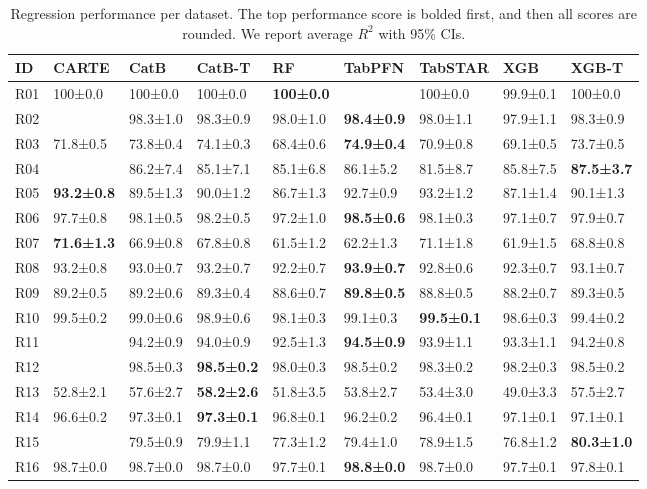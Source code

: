 \begin{table}
\center
\footnotesize
\caption{Regression performance per dataset. The top performance score is bolded first, and then all scores are rounded. We report average  $R^2$ with 95\% CIs.}
\label{tab:reg_10k_dataset_performance}
\begin{tabular}{lllllllll}
\toprule
ID & CARTE & CatB & CatB-T & RF & TabPFN & TabSTAR & XGB & XGB-T \\
\midrule
R01 & 100±0.0 & 100±0.0 & 100±0.0 & \textbf{100±0.0} &  & 100±0.0 & 99.9±0.1 & 100±0.0 \\
R02 &  & 98.3±1.0 & 98.3±0.9 & 98.0±1.0 & \textbf{98.4±0.9} & 98.0±1.1 & 97.9±1.1 & 98.3±0.9 \\
R03 & 71.8±0.5 & 73.8±0.4 & 74.1±0.3 & 68.4±0.6 & \textbf{74.9±0.4} & 70.9±0.8 & 69.1±0.5 & 73.7±0.5 \\
R04 &  & 86.2±7.4 & 85.1±7.1 & 85.1±6.8 & 86.1±5.2 & 81.5±8.7 & 85.8±7.5 & \textbf{87.5±3.7} \\
R05 & \textbf{93.2±0.8} & 89.5±1.3 & 90.0±1.2 & 86.7±1.3 & 92.7±0.9 & 93.2±1.2 & 87.1±1.4 & 90.1±1.3 \\
R06 & 97.7±0.8 & 98.1±0.5 & 98.2±0.5 & 97.2±1.0 & \textbf{98.5±0.6} & 98.1±0.3 & 97.1±0.7 & 97.9±0.7 \\
R07 & \textbf{71.6±1.3} & 66.9±0.8 & 67.8±0.8 & 61.5±1.2 & 62.2±1.3 & 71.1±1.8 & 61.9±1.5 & 68.8±0.8 \\
R08 & 93.2±0.8 & 93.0±0.7 & 93.2±0.7 & 92.2±0.7 & \textbf{93.9±0.7} & 92.8±0.6 & 92.3±0.7 & 93.1±0.7 \\
R09 & 89.2±0.5 & 89.2±0.6 & 89.3±0.4 & 88.6±0.7 & \textbf{89.8±0.5} & 88.8±0.5 & 88.2±0.7 & 89.3±0.5 \\
R10 & 99.5±0.2 & 99.0±0.6 & 98.9±0.6 & 98.1±0.3 & 99.1±0.3 & \textbf{99.5±0.1} & 98.6±0.3 & 99.4±0.2 \\
R11 &  & 94.2±0.9 & 94.0±0.9 & 92.5±1.3 & \textbf{94.5±0.9} & 93.9±1.1 & 93.3±1.1 & 94.2±0.8 \\
R12 &  & 98.5±0.3 & \textbf{98.5±0.2} & 98.0±0.3 & 98.5±0.2 & 98.3±0.2 & 98.2±0.3 & 98.5±0.2 \\
R13 & 52.8±2.1 & 57.6±2.7 & \textbf{58.2±2.6} & 51.8±3.5 & 53.8±2.7 & 53.4±3.0 & 49.0±3.3 & 57.5±2.7 \\
R14 & 96.6±0.2 & 97.3±0.1 & \textbf{97.3±0.1} & 96.8±0.1 & 96.2±0.2 & 96.4±0.1 & 97.1±0.1 & 97.1±0.1 \\
R15 &  & 79.5±0.9 & 79.9±1.1 & 77.3±1.2 & 79.4±1.0 & 78.9±1.5 & 76.8±1.2 & \textbf{80.3±1.0} \\
R16 & 98.7±0.0 & 98.7±0.0 & 98.7±0.0 & 97.7±0.1 & \textbf{98.8±0.0} & 98.7±0.0 & 97.7±0.1 & 97.8±0.1 \\

\end{tabular}
\end{table}
